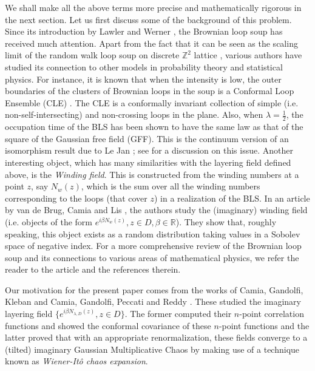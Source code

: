 \documentclass[a4paper, 11pt, reqno]{amsart}
\theoremstyle{definition} \newtheorem{defn}{Definition}[section]
\theoremstyle{remark} \newtheorem{rem}[defn]{Remark}
\theoremstyle{remark} \newtheorem*{rem*}{Remark}
\theoremstyle{plain} \newtheorem{thm}[defn]{Theorem}
\theoremstyle{plain} \newtheorem{lem}[defn]{Lemma}
\theoremstyle{plain} \newtheorem{prop}[defn]{Proposition}
\theoremstyle{plain} \newtheorem{cor}[defn]{Corollary}
\theoremstyle{remark} \newtheorem{exm}[defn]{\textbf{Example}}
\theoremstyle{remark} \newtheorem{exms}[defn]{\textbf{Examples}}
\theoremstyle{remark} \newtheorem*{bl}{}
\numberwithin{equation}{section} %
\newcommand{\R}{\mathbb{R}}
\newcommand{\Z}{\mathbb{Z}}
\begin{document}
    We shall make all the above terms more precise and mathematically rigorous in the next section. Let us first discuss some of the background of this problem. Since its introduction by Lawler and Werner \cite{lw04}, the Brownian loop soup has received much attention. Apart from the fact that it can be seen as the scaling limit of the random walk loop soup on discrete $\Z^2$ lattice \cite{lt07}, various authors have studied its connection to other models in probability theory and statistical physics. For instance, it is known that when the intensity is low, the outer boundaries of the clusters of Brownian loops in the soup is a Conformal Loop Ensemble (CLE) \cite[Theorem 3]{werner06}. The CLE is a conformally invariant collection of simple (i.e. non-self-intersecting) and non-crossing loops in the plane. Also, when $\lambda=\frac{1}{2}$, the occupation time of the BLS has been shown to have the same law as that of the square of the Gaussian free field (GFF). This is the continuum version of an isomorphism result due to Le Jan \cite{lejan10}; see \cite[Section 3.4]{wp21} for a discussion on this issue. Another interesting object, which has many similarities with the layering field defined above, is the \textit{Winding field}. This is constructed from the winding numbers at a point $z$, say $N_w(z)$, which is the sum over all the winding numbers corresponding to the loops (that cover $z$) in a realization of the BLS. In an article by van de Brug, Camia and Lis \cite{vcl18}, the authors study the (imaginary) winding field (i.e. objects of the form $e^{i \beta N_w(z)}, z \in D, \beta \in \R$). They show that, roughly speaking, this object exists as a random distribution taking values in a Sobolev space of negative index. For a more comprehensive review of the Brownian loop soup and its connections to various areas of mathematical physics, we refer the reader to the article \cite{camia17} and the references therein. 

    Our motivation for the present paper comes from the works of Camia, Gandolfi, Kleban \cite{cgk16} and Camia, Gandolfi, Peccati and Reddy \cite{cgpr21}. These studied the imaginary layering field $\{e^{i \beta N_{\lambda, D}(z)}, z \in D\}$. The former computed their $n$-point correlation functions and showed the conformal covariance of these $n$-point functions and the latter proved that with an appropriate renormalization, these fields converge to a (tilted) imaginary Gaussian Multiplicative Chaos by making use of a technique known as \textit{Wiener-It\^{o} chaos expansion}. 
    
\end{document}
